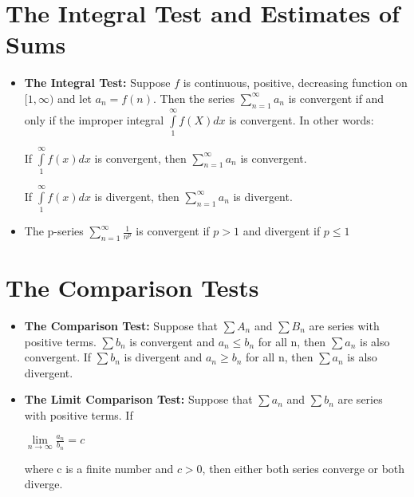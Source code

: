\documentclass{report}
\begin{document}
	\section{The Integral Test and Estimates of Sums}
		\begin{itemize}\addtolength{\leftskip}{2em}
			\item \textbf{The Integral Test:} Suppose $f$ is continuous, positive, decreasing function on $[1,\infty)$ and let $a_n=f(n)$. Then the series $\sum\limits_{n=1}^{\infty}a_n$ is convergent if and only if the improper integral $\int\limits_{1}^{\infty}f(X)dx$ is convergent. In other words:
			\begin{center}
			If $\int\limits_{1}^{\infty}f(x)dx$ is convergent, then $\sum\limits_{n=1}^{\infty}a_n$ is convergent.
			\end{center}
			\begin{center}
			If $\int\limits_{1}^{\infty}f(x)dx$ is divergent, then $\sum\limits_{n=1}^{\infty}a_n$ is divergent.
			\end{center}
			\item The p-series $\sum\limits_{n=1}^{\infty}\frac{1}{n^p}$ is convergent if $p>1$ and divergent if $p\le 1$
		\end{itemize}
	\section{The Comparison Tests}
		\begin{itemize}\addtolength{\leftskip}{2em}
			\item \textbf{The Comparison Test:} Suppose that $\sum A_n$ and $\sum B_n$ are series with positive terms.\newline
			\newline
			$\sum b_n$ is convergent and $a_n\le b_n$ for all n, then $\sum a_n$ is also convergent.\newline
			If $\sum b_n$ is divergent and $a_n\ge b_n$ for all n, then $\sum a_n$ is also divergent.
			\item \textbf{The Limit Comparison Test:} Suppose that $\sum a_n$ and $\sum b_n$ are series with positive terms. If
			\begin{center}
			$\lim\limits_{n\rightarrow \infty}\frac{a_n}{b_n}=c$
			\end{center}
			\begin{center}
			where c is a finite number and $c>0$, then either both series converge or both diverge.
			\end{center}
		\end{itemize}
\end{document}

